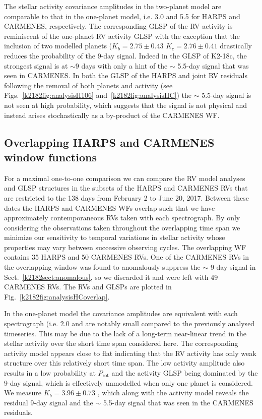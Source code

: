 The stellar activity covariance amplitudes in the two-planet model are comparable to that in the one-planet model, i.e.
3.0 and 5.5 \mps{} for HARPS and CARMENES, respectively.
The corresponding GLSP of the RV activity is reminiscent of the one-planet RV activity GLSP with the exception
that the inclusion of two modelled planets ($K_b=2.75\pm 0.43$ \mps{,} $K_c=2.76\pm 0.41$ \mps{)} 
drastically reduces the probability of the 9-day signal.
Indeed in the GLSP of K2-18c, the strongest signal is at $\sim 9$ days with only a hint of the $\sim$ 5.5-day signal that was seen in CARMENES.
In both the GLSP of the HARPS and joint RV residuals following the removal of both planets and
activity (see Figs.~\ref{k2182fig:analysisH106} and~\ref{k2182fig:analysisHC})
the $\sim$ 5.5-day signal is not seen at high probability, which suggests that the signal is not physical
and instead arises stochastically as a by-product of the CARMENES WF.


\subsection{Overlapping HARPS and CARMENES window functions}
For a maximal one-to-one comparison we can compare the RV model analyses and GLSP structures
in the subsets of the HARPS and CARMENES RVs that are restricted to the 138 days from February 2 to
June 20, 2017. Between these dates the HARPS and CARMENES WFs overlap such that we
have approximately contemporaneous RVs taken with each spectrograph. By only considering
the observations taken throughout the overlapping time span we minimize our sensitivity to temporal
variations in stellar activity whose properties may vary between successive observing cycles. The overlapping
WF contains 35 HARPS and 50 CARMENES RVs. One of the CARMENES RVs in the overlapping window
was found to anomalously suppress the $\sim$ 9-day signal in Sect.~\ref{k2182sect:anomalous}, so we discarded it and
were left with 49 CARMENES RVs. The RVs and GLSPs are plotted in Fig.~\ref{k2182fig:analysisHCoverlap}.

In the one-planet model the covariance amplitudes are equivalent with
each spectrograph (i.e. 2.0 \mps{)} and are notably small compared to the previously
analysed timeseries. This may be due to the lack of a long-term near-linear trend in the stellar activity
over the short time span considered here.
The corresponding activity model appears close to flat indicating that the RV activity
has only weak structure over this relatively short time span. The low activity amplitude also results in
a low probability at $P_{\text{rot}}$ and the activity GLSP being dominated by the 9-day signal, which is effectively
unmodelled when only one planet is considered.
We measure $K_b=3.96\pm 0.73$ \mps{}, which along with the activity model reveals the residual 9-day signal
and the $\sim$ 5.5-day signal that was seen in the CARMENES residuals.

